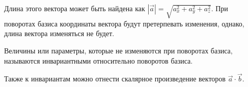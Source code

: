     Длина этого вектора может быть найдена как \( |\vec{a}| = \sqrt{a_x^2+a_y^2+a_z^2} \). При поворотах базиса координаты вектора будут претерпевать изменения, однако, длина вектора изменяться не будет.

    \begin{definition}
        Величины или параметры, которые не изменяются при поворотах базиса, называются инвариантными относительно поворотов базиса.
    \end{definition}

    Также к инвариантам можно отнести скалярное произведение векторов \( \vec{a}\cdot\vec{b} \).
